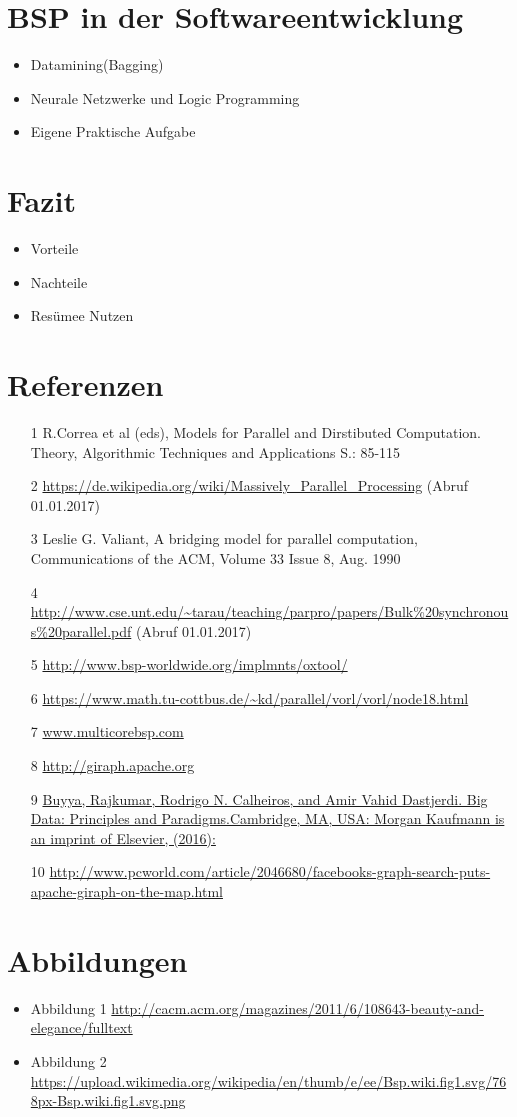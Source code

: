 \documentclass[a4paper,10pt]{scrartcl}
\begin{document}
\section{BSP in der Softwareentwicklung}
\begin{itemize}
\item Datamining(Bagging)
\item Neurale Netzwerke und Logic Programming
\item Eigene Praktische Aufgabe
\end{itemize}
\section{Fazit}
\begin{itemize}
 \item Vorteile
 \item Nachteile
 \item Resümee Nutzen
\end{itemize}
\newpage
\section{Referenzen}
\begin{itemize}
\item [1] R.Correa et al (eds), Models for Parallel and Dirstibuted Computation. Theory, Algorithmic Techniques and Applications S.: 85-115
\item [2] \url{https://de.wikipedia.org/wiki/Massively_Parallel_Processing} (Abruf 01.01.2017)
\item [3] Leslie G. Valiant, A bridging model for parallel computation, Communications of the ACM, Volume 33 Issue 8, Aug. 1990 
\item [4] \url{http://www.cse.unt.edu/~tarau/teaching/parpro/papers/Bulk%20synchronous%20parallel.pdf} (Abruf 01.01.2017)
\item [5] \url{http://www.bsp-worldwide.org/implmnts/oxtool/}
\item [6] \url{https://www.math.tu-cottbus.de/~kd/parallel/vorl/vorl/node18.html}
\item [7] \url{www.multicorebsp.com}
\item [8] \url{http://giraph.apache.org}
\item [9] \url{Buyya, Rajkumar, Rodrigo N. Calheiros, and Amir Vahid Dastjerdi. Big Data: Principles and Paradigms.Cambridge, MA, USA: Morgan Kaufmann is an imprint of Elsevier, (2016):}
\item [10] \url{http://www.pcworld.com/article/2046680/facebooks-graph-search-puts-apache-giraph-on-the-map.html}
\end{itemize}
\section{Abbildungen}
\begin{itemize}
\item Abbildung 1 \url{http://cacm.acm.org/magazines/2011/6/108643-beauty-and-elegance/fulltext}
\item Abbildung 2 \url{https://upload.wikimedia.org/wikipedia/en/thumb/e/ee/Bsp.wiki.fig1.svg/768px-Bsp.wiki.fig1.svg.png}
       
\end{itemize}
\end{document}
